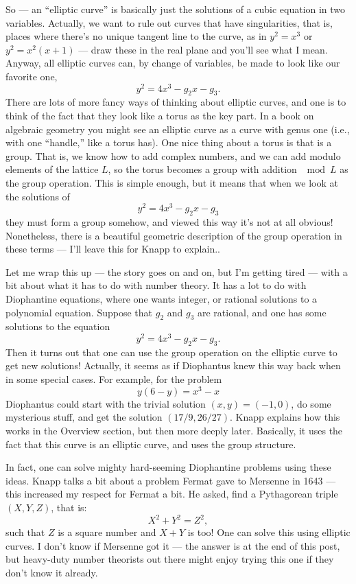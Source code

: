 \documentclass{article}
\begin{document}
So --- an ``elliptic curve'' is basically just the solutions of a cubic
equation in two variables. Actually, we want to rule out curves that
have singularities, that is, places where there's no unique tangent line
to the curve, as in \(y^2 = x^3\) or \(y^2 = x^2(x+1)\) --- draw these
in the real plane and you'll see what I mean. Anyway, all elliptic
curves can, by change of variables, be made to look like our favorite
one, \[y^2 = 4x^3 -g_2 x -g_3.\] There are lots of more fancy ways of
thinking about elliptic curves, and one is to think of the fact that
they look like a torus as the key part. In a book on algebraic geometry
you might see an elliptic curve as a curve with genus one (i.e., with
one ``handle,'' like a torus has). One nice thing about a torus is that
is a group. That is, we know how to add complex numbers, and we can add
modulo elements of the lattice \(L\), so the torus becomes a group with
addition \(\mod L\) as the group operation. This is simple enough, but
it means that when we look at the solutions of
\[y^2 = 4x^3 -g_2 x -g_3\] they must form a group somehow, and viewed
this way it's not at all obvious! Nonetheless, there is a beautiful
geometric description of the group operation in these terms --- I'll
leave this for Knapp to explain..

Let me wrap this up --- the story goes on and on, but I'm getting tired
--- with a bit about what it has to do with number theory. It has a lot
to do with Diophantine equations, where one wants integer, or rational
solutions to a polynomial equation. Suppose that \(g_2\) and \(g_3\) are
rational, and one has some solutions to the equation
\[y^2 = 4x^3 - g_2 x - g_3.\] 
Then it turns out that one can use the
group operation on the elliptic curve to get new solutions! Actually, it
seems as if Diophantus knew this way back when in some special cases.
For example, for the problem \[y(6 -y) = x^3 -x\] Diophantus could start
with the trivial solution \((x,y) = (-1,0)\), do some mysterious stuff,
and get the solution \((17/9,26/27)\). Knapp explains how this works in
the Overview section, but then more deeply later. Basically, it uses the
fact that this curve is an elliptic curve, and uses the group structure.

In fact, one can solve mighty hard-seeming Diophantine problems using
these ideas. Knapp talks a bit about a problem Fermat gave to Mersenne
in 1643 --- this increased my respect for Fermat a bit. He asked, find a
Pythagorean triple \((X,Y,Z)\), that is: 
\[X^2 + Y^2 = Z^2,\]
such that \(Z\) is a square number and \(X + Y\) is too! One can solve
this using elliptic curves. I don't know if Mersenne got it --- the
answer is at the end of this post, but heavy-duty number theorists out
there might enjoy trying this one if they don't know it already.
\end{document}
